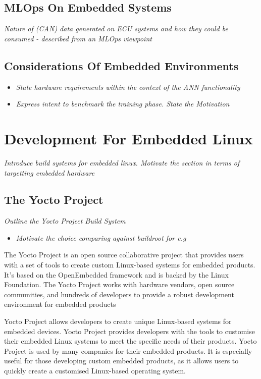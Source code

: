 \subsection[Machine Learning on Embedded Devices]{MLOps On Embedded Systems}
\textit{Nature of (CAN) data generated on ECU systems and how they could be consumed - described from an MLOps viewpoint }

\subsection[Considerations of Embedded Environments]{Considerations Of Embedded Environments}
\begin{itemize}
	\item \textit{State hardware requirements within the context of the ANN functionality}
	\item \textit{Express intent to benchmark the training phase. State the Motivation}
\end{itemize}

\section[Development Process for Embedded Linux]{Development For Embedded Linux}
\textit{Introduce build systems for embedded linux. Motivate the section in terms of targetting embedded hardware}

\subsection[Build Systems : The Yocto Project]{The Yocto Project}
\textit{Outline the Yocto Project Build System}

\begin{itemize}
	\item \textit{Motivate the choice comparing against buildroot for e.g}
\end{itemize}

The Yocto Project is an open source collaborative project that provides users with a set of tools to create custom Linux-based systems for embedded products. It's based on the OpenEmbedded framework and is backed by the Linux Foundation. The Yocto Project works with hardware vendors, open source communities, and hundreds of developers to provide a robust development environment for embedded products

Yocto Project allows developers to create unique Linux-based systems for embedded devices. Yocto Project provides developers with the tools to customise their embedded Linux systems to meet the specific needs of their products. Yocto Project is used by many companies for their embedded products. It is especially useful for those developing custom embedded products, as it allows users to quickly create a customised Linux-based operating system.

